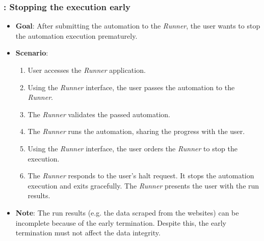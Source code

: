 \subsubsection*{\usecase: Stopping the execution early}
\begin{itemize}
    \item \textbf{Goal}: After submitting the automation to the \textit{Runner}, the user wants to stop the automation execution prematurely.
    \item \textbf{Scenario}: 
    \begin{enumerate}[label=\arabic*.]
        \item User accesses the \textit{Runner} application.
        \item Using the \textit{Runner} interface, the user passes the automation to the \textit{Runner}.
        \item The \textit{Runner} validates the passed automation.
        \item The \textit{Runner} runs the automation, sharing the progress with the user.
        \item Using the \textit{Runner} interface, the user orders the \textit{Runner} to stop the execution.
        \item The \textit{Runner} responds to the user's halt request. It stops the automation execution and exits gracefully. 
        The \textit{Runner} presents the user with the run results.
    \end{enumerate}
    \item \textbf{Note}: The run results (e.g. the data scraped from the websites) can be incomplete because of the early termination.
    Despite this, the early termination must not affect the data integrity.
\end{itemize}

